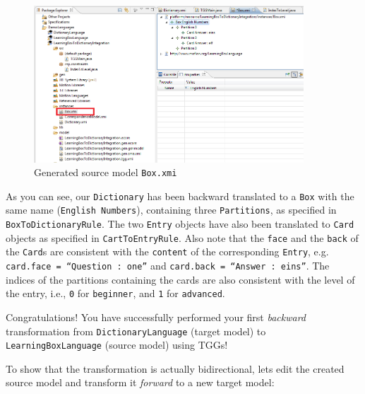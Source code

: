 \begin{enumerate}
\begin{figure}[htbp]
\begin{center}
  \includegraphics[width=0.9\textwidth]{pics/tggBilder/transformation/tgg27}
  \caption{Generated source model \texttt{Box.xmi}}  
  \label{fig:boxxmi}
\end{center}
\end{figure} 

\end{enumerate}

As you can see, our \texttt{Dictionary} has been backward translated to a \texttt{Box} with the same name (\texttt{English Numbers}), containing three \texttt{Par\-ti\-tions}, as specified in \texttt{Box\-To\-Dictionary\-Rule}.
The two \texttt{Entry} objects have also been translated to \texttt{Card} objects as specified in \texttt{CartToEntryRule}.
Also note that the \texttt{face} and the \texttt{back} of the \texttt{Card}s are consistent with the \texttt{content} of the corresponding \texttt{Entry}, e.g. \texttt{card.face = ``Question : one''} and \texttt{card.back = ``Answer : eins''}. 
The indices of the partitions containing the cards are also consistent with the level of the entry, i.e., \texttt{0} for \texttt{beginner}, and \texttt{1} for \texttt{advanced}.

Congratulations! You have successfully performed your first \emph{backward} transformation from \texttt{Dictionary\-Language} (target model) to \texttt{Learn\-ing\-Box\-Lan\-guage} (source model) using TGGs!

To show that the transformation is actually bidirectional, lets edit the created source model and transform it \emph{forward} to a new target model:

